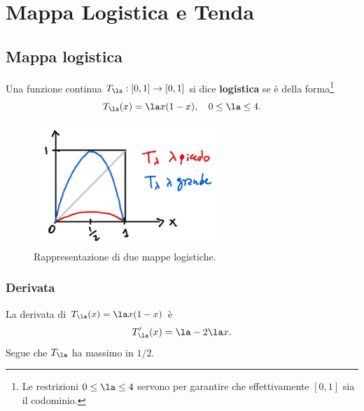\section{Mappa Logistica e Tenda}
\subsection{Mappa logistica} 
\begin{definition}
Una funzione continua $T_\la:[0,1]\to[0,1]$ si dice \textbf{logistica} se \`e della forma\footnote{Le restrizioni $0\leq \la\leq 4$ servono per garantire che effettivamente $[0,1]$ sia il codominio.}
\[T_\la(x)=\la x(1-x),\quad 0\leq \la\leq 4.\]
\end{definition}

\begin{figure}[!htb]
    \centering
    \includegraphics[width=7cm]{Immagini/Logistica.png}
    \caption{Rappresentazione di due mappe logistiche.}
\end{figure}

\subsubsection{Derivata}
La derivata di $T_\la(x)=\la x(1-x)$ \`e
\[T'_\la(x)=\la-2\la x.\]
Segue che $T_\la$ ha massimo in $1/2$.
